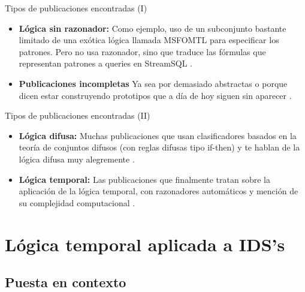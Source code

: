 \documentclass{beamer}
\begin{document}
\begin{frame}{Tipos de publicaciones encontradas (I)}

\begin{itemize}
	\item \textbf{Lógica sin razonador:} Como ejemplo, uso de un subconjunto bastante limitado de una exótica lógica llamada MSFOMTL para especificar los patrones. Pero no usa razonador, sino que traduce las fórmulas que representan patrones a queries en StreamSQL \cite{musulman}.
\end{itemize}
\begin{itemize}
	\item \textbf{Publicaciones incompletas} Ya sea por demasiado abstractas \cite{abstracto} o porque dicen estar construyendo prototipos que a día de hoy siguen sin aparecer \cite{prototipo}.
\end{itemize}

\end{frame}

\begin{frame}{Tipos de publicaciones encontradas (II)}

\begin{itemize}
	\item \textbf{Lógica difusa:} Muchas publicaciones que usan clasificadores basados en la teoría de conjuntos difusos (con reglas difusas tipo if-then) y te hablan de la lógica difusa muy alegremente \cite{difusa}.
\end{itemize}
\begin{itemize}
	\item \textbf{Lógica temporal:} Las publicaciones que finalmente tratan sobre la aplicación de la lógica temporal, con razonadores automáticos y mención de su complejidad computacional \cite{temporal}.
\end{itemize}

\end{frame}

\section{Lógica temporal aplicada a IDS's}

\subsection{Puesta en contexto}
\end{document}
